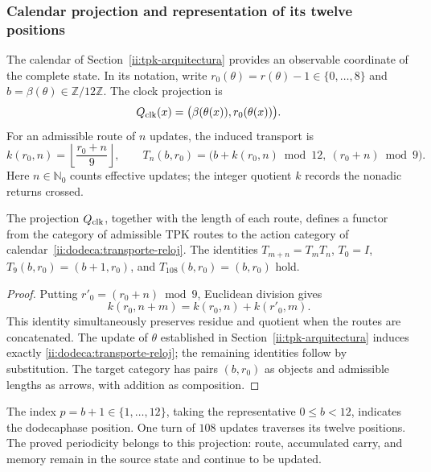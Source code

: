 \subsubsection{Calendar projection and representation of its twelve positions}
\label{ii:dodeca:calendario}
The calendar of Section~\ref{ii:tpk-arquitectura} provides an
observable coordinate of the complete state. In its notation, write
\(r_0(\theta)=r(\theta)-1\in\{0,\ldots,8\}\) and
\(b=\beta(\theta)\in\mathbb Z/12\mathbb Z\). The clock projection is
\[
 Q_{\rm clk}(x)=\bigl(\beta(\theta(x)),r_0(\theta(x))\bigr).
\]
For an admissible route of \(n\) updates, the induced transport is
\begin{equation}
 k(r_0,n)=\left\lfloor\frac{r_0+n}{9}\right\rfloor,
 \qquad
 T_n(b,r_0)=\bigl(b+k(r_0,n)\bmod12,\ (r_0+n)\bmod9\bigr).
 \label{ii:dodeca:transporte-reloj}
\end{equation}
Here \(n\in\mathbb N_0\) counts effective updates; the integer
quotient \(k\) records the nonadic returns crossed.

\begin{proposition}
\label{ii:dodeca:composicion}
The projection \(Q_{\rm clk}\), together with the length of each route, defines
a functor from the category of admissible TPK routes to the action category
of calendar~\eqref{ii:dodeca:transporte-reloj}. The identities
\(T_{m+n}=T_mT_n\), \(T_0=I\),
\(T_9(b,r_0)=(b+1,r_0)\), and \(T_{108}(b,r_0)=(b,r_0)\) hold.
\end{proposition}
\begin{proof}
Putting \(r'_0=(r_0+n)\bmod9\), Euclidean division gives
\[
 k(r_0,n+m)=k(r_0,n)+k(r'_0,m).
\]
This identity simultaneously preserves residue and quotient when the
routes are concatenated. The update of \(\theta\) established in
Section~\ref{ii:tpk-arquitectura} induces exactly
\eqref{ii:dodeca:transporte-reloj}; the remaining identities follow
by substitution. The target category has pairs \((b,r_0)\) as
objects and admissible lengths as arrows, with addition as composition.
\end{proof}

The index \(p=b+1\in\{1,\ldots,12\}\), taking the representative
\(0\le b<12\), indicates the dodecaphase position. One turn of
\(108\) updates traverses its twelve positions. The proved periodicity
belongs to this projection: route, accumulated carry, and
memory remain in the source state and continue to be updated.

